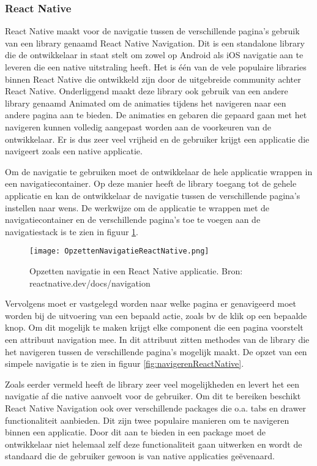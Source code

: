 \subsubsection{React Native}
\label{subsubsec:navigatieReactNative}

React Native maakt voor de navigatie tussen de verschillende pagina's gebruik van een library genaamd React Native Navigation. Dit is een standalone library die de ontwikkelaar in staat stelt om zowel op Android als iOS navigatie aan te leveren die een native uitstraling heeft. Het is één van de vele populaire libraries binnen React Native die ontwikkeld zijn door de uitgebreide community achter React Native. Onderliggend maakt deze library ook gebruik van een andere library genaamd Animated om de animaties tijdens het navigeren naar een andere pagina aan te bieden. De animaties en gebaren die gepaard gaan met het navigeren kunnen volledig aangepast worden aan de voorkeuren van de ontwikkelaar. Er is dus zeer veel vrijheid en de gebruiker krijgt een applicatie die navigeert zoals een native applicatie. 

Om de navigatie te gebruiken moet de ontwikkelaar de hele applicatie wrappen in een navigatiecontainer. Op deze manier heeft de library toegang tot de gehele applicatie en kan de ontwikkelaar de navigatie tussen de verschillende pagina's instellen naar wens. De werkwijze om de applicatie te wrappen met de navigatiecontainer en de verschillende pagina's toe te voegen aan de navigatiestack is te zien in figuur \ref{fig:opzettenNavigatieReactNative}.

\begin{figure}
    \texttt{[image: OpzettenNavigatieReactNative.png]}
    \caption{Opzetten navigatie in een React Native applicatie. Bron: reactnative.dev/docs/navigation}
    \label{fig:opzettenNavigatieReactNative}
\end{figure}

Vervolgens moet er vastgelegd worden naar welke pagina er genavigeerd moet worden bij de uitvoering van een bepaald actie, zoals bv de klik op een bepaalde knop. Om dit mogelijk te maken krijgt elke component die een pagina voorstelt een attribuut navigation mee. In dit attribuut zitten methodes van de library die het navigeren tussen de verschillende pagina's mogelijk maakt. De opzet van een simpele navigatie is te zien in figuur \ref{fig:navigerenReactNative}. 

Zoals eerder vermeld heeft de library zeer veel mogelijkheden en levert het een navigatie af die native aanvoelt voor de gebruiker. Om dit te bereiken beschikt React Native Navigation ook over verschillende packages die o.a. tabs en drawer functionaliteit aanbieden. Dit zijn twee populaire manieren om te navigeren binnen een applicatie. Door dit aan te bieden in een package moet de ontwikkelaar niet helemaal zelf deze functionaliteit gaan uitwerken en wordt de standaard die de gebruiker gewoon is van native applicaties geëvenaard.

